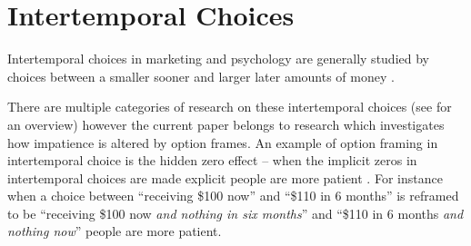 \documentclass[]{article}
\begin{document}

%

\section{Intertemporal Choices}

Intertemporal choices in marketing and psychology are generally studied by choices between a smaller sooner and larger later amounts of money \cite{Zauberman2014}. 

There are multiple categories of research on these intertemporal choices (see  for an overview) however the current paper belongs to research which investigates how impatience is altered by option frames. 
An example of option framing in intertemporal choice is the hidden zero effect -- when the implicit zeros in intertemporal choices are made explicit people are more patient \cite{Magen2008}. 
For instance when a choice between ``receiving \$100 now'' and ``\$110 in 6 months'' is reframed to be  ``receiving \$100 now \textit{and nothing in six months}'' and ``\$110 in 6 months \textit{and nothing now}'' people are more patient. 
\end{document}
